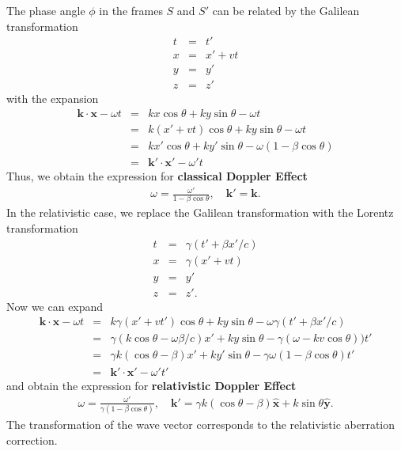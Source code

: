 \documentclass [12pt, a4paper] {article}
\newcommand{\vu}[1]
{
	\mathbf{\hat #1}
}
\newcommand{\vc}[1]
{
	\boldsymbol{#1}
}
\begin{document}
The phase angle $\phi$ in the frames $S$ and $S'$ can be related by the Galilean
transformation
\begin {eqnarray}
    t &=& t' \\
    x &=& x' + vt \\
    y &=& y' \\
    z &=& z'
\end {eqnarray}
with the expansion 
\begin {eqnarray}
    \vc k\cdot\vc x - \omega t
    &=&
    kx \cos\theta + ky \sin\theta - \omega t 
    \\
    &=& 
    k(x' + vt) \cos\theta + ky \sin\theta - \omega t 
    \\
    &=& 
    kx'\cos\theta + ky'\sin\theta -\omega(1 -\beta\cos\theta)
    \\
    &=& 
    \vc k'\cdot\vc x' - \omega' t
\end {eqnarray}
Thus, we obtain the expression for \textbf{classical Doppler Effect}
\begin {eqnarray}
    \boxed{
        \quad
        \omega = \frac{\omega'}{1 - \beta\cos\theta},
        \quad
        \vc k' = \vc k.
        \quad
    }
\end {eqnarray}
In the relativistic case, we replace the Galilean transformation with the Lorentz 
transformation 
\begin {eqnarray}
    t &=& \gamma(t' + \beta x'/c) \\
    x &=& \gamma(x' + vt) \\
    y &=& y' \\
    z &=& z'.
\end {eqnarray}
Now we can expand 
\begin {eqnarray}
    \vc k\cdot\vc x - \omega t 
    &=& 
    k\gamma(x' + vt')\cos\theta + ky\sin\theta  - \omega\gamma(t' + \beta x'/c)
    \\
    &=& 
    \gamma (k\cos\theta - \omega\beta/c)x' 
    + 
    ky\sin\theta 
    - 
    \gamma(\omega - kv\cos\theta)) t'
    \\
    &=& 
    \gamma k (\cos\theta - \beta)x'
    +
    ky'\sin\theta 
    -
    \gamma\omega(1 - \beta\cos\theta)t'
    \\
    &=& 
    \vc k'\cdot\vc x' - \omega' t' 
\end {eqnarray}
and obtain the expression for \textbf{relativistic Doppler Effect}
\begin {eqnarray}
    \label{eq:doppler_relativistic}
    \boxed{
        \quad
        \omega = \frac{\omega'}{\gamma(1 - \beta\cos\theta)},
        \quad
        \vc k' = \gamma k(\cos\theta - \beta)\vu x 
        +
        k\sin\theta\vu y.
        \quad
    }
\end {eqnarray}
The transformation of the wave vector corresponds to the relativistic aberration 
correction. 
\end{document}
